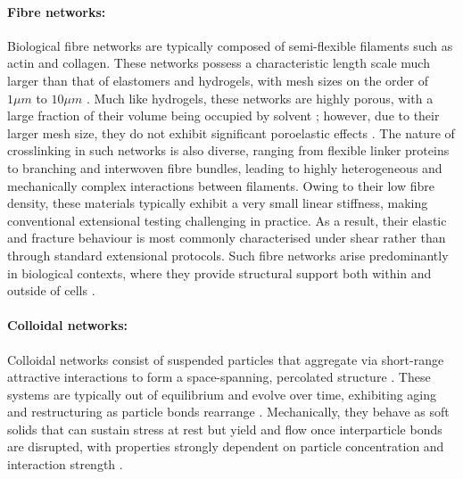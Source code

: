 \documentclass[asymmetricmargins]{library/duthesis}%
\begin{document}
\paragraph{Fibre networks:}
Biological fibre networks are typically composed of semi-flexible filaments such as actin and collagen. These networks possess a characteristic length scale much larger than that of elastomers and hydrogels, with mesh sizes on the order of $1 \mu m$ to $10 \mu m$ \cite{mackintosh_elasticity_1995,Arevalo_Stress_Heterogeneities_2015}.
Much like hydrogels, these networks are highly porous, with a large fraction of their volume being occupied by solvent \cite{Jansen_Role_Collagen_2018}; however, due to their larger mesh size, they do not exhibit significant poroelastic effects \cite{Arevalo_Stress_Heterogeneities_2015}. The nature of crosslinking in such networks is also diverse, ranging from flexible linker proteins to branching and interwoven fibre bundles, leading to highly heterogeneous and mechanically complex interactions between filaments. Owing to their low fibre density, these materials typically exhibit a very small linear stiffness, making conventional extensional testing challenging in practice. As a result, their elastic and fracture behaviour is most commonly characterised under shear rather than through standard extensional protocols. Such fibre networks arise predominantly in biological contexts, where they provide structural support both within and outside of cells \cite{burlaMechanicalResilienceActive2019}.

\paragraph{Colloidal networks:}
Colloidal networks consist of suspended particles that aggregate via short-range attractive interactions to form a space-spanning, percolated structure \cite{Mewis2011,nabizadeh_network_2024,Chen2020,zhang_correlated_2019}. These systems are typically out of equilibrium and evolve over time, exhibiting aging and restructuring as particle bonds rearrange \cite{viasnoffHowAreColloidal2003,renouYieldingProcessesColloidal2010,manley_gravitational_2005}. Mechanically, they behave as soft solids that can sustain stress at rest but yield and flow once interparticle bonds are disrupted, with properties strongly dependent on particle concentration and interaction strength \cite{Mewis2011}.
\end{document}
